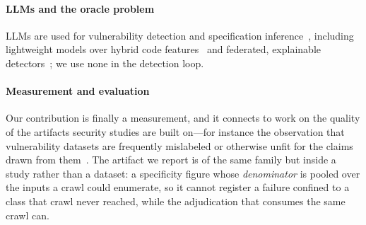 \paragraph{LLMs and the oracle problem} LLMs are used for vulnerability detection and
specification inference~\cite{Wang2024A,Wen2024Enchanting,Wang2026Measuring,LeCong2025Can},
including lightweight models over hybrid code features~\cite{Liu2024Enhancing} and
federated, explainable detectors~\cite{Senanayake2024Defendroid}; we use none in the
detection loop.

\paragraph{Measurement and evaluation} Our contribution is finally a measurement,
and it connects to work on the quality of the artifacts security studies are built
on---for instance the observation that vulnerability datasets are frequently
mislabeled or otherwise unfit for the claims drawn from
them~\cite{Croft2023Data}. The artifact we report is of the same family but inside a
study rather than a dataset: a specificity figure whose \emph{denominator} is pooled
over the inputs a crawl could enumerate, so it cannot register a failure confined to
a class that crawl never reached, while the adjudication that consumes the same crawl
can.
